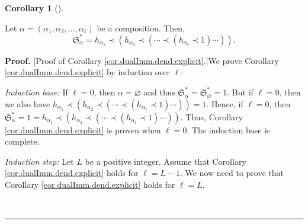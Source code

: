 \documentclass
[numbers=enddot,12pt,final,onecolumn,notitlepage,abstracton]{scrartcl}%
\theoremstyle{definition}
\newtheorem{coro}[theo]{Corollary}
\newenvironment{corollary}[1][]
{\begin{coro}[#1]\begin{leftbar}}
{\end{leftbar}\end{coro}}
\newenvironment{proof}[1][Proof]{\noindent\textbf{#1.} }{\ \rule{0.5em}{0.5em}}
\newenvironment{verlong}{}{}
\begin{document}
\begin{corollary}
\label{cor.dualImm.dend.explicit}Let $\alpha=\left(  \alpha_{1},\alpha
_{2},\ldots,\alpha_{\ell}\right)  $ be a composition. Then,%
\[
\mathfrak{S}_{\alpha}^{\ast}=h_{\alpha_{1}}\left.  \prec\right.  \left(
h_{\alpha_{2}}\left.  \prec\right.  \left(  \cdots\left.  \prec\right.
\left(  h_{\alpha_{\ell}}\left.  \prec\right.  1\right)  \cdots\right)
\right)  .
\]

\end{corollary}

\begin{verlong}
\begin{proof}
[Proof of Corollary \ref{cor.dualImm.dend.explicit}.]We prove Corollary
\ref{cor.dualImm.dend.explicit} by induction over $\ell$:

\textit{Induction base:} If $\ell=0$, then $\alpha=\varnothing$ and thus
$\mathfrak{S}_{\alpha}^{\ast}=\mathfrak{S}_{\varnothing}^{\ast}=1$. But if
$\ell=0$, then we also have $h_{\alpha_{1}}\left.  \prec\right.  \left(
h_{\alpha_{2}}\left.  \prec\right.  \left(  \cdots\left.  \prec\right.
\left(  h_{\alpha_{\ell}}\left.  \prec\right.  1\right)  \cdots\right)
\right)  =1$. Hence, if $\ell=0$, then $\mathfrak{S}_{\alpha}^{\ast
}=1=h_{\alpha_{1}}\left.  \prec\right.  \left(  h_{\alpha_{2}}\left.
\prec\right.  \left(  \cdots\left.  \prec\right.  \left(  h_{\alpha_{\ell}%
}\left.  \prec\right.  1\right)  \cdots\right)  \right)  $. Thus, Corollary
\ref{cor.dualImm.dend.explicit} is proven when $\ell=0$. The induction base is complete.

\textit{Induction step:} Let $L$ be a positive integer. Assume that Corollary
\ref{cor.dualImm.dend.explicit} holds for $\ell=L-1$. We now need to prove
that Corollary \ref{cor.dualImm.dend.explicit} holds for $\ell=L$.


\end{proof}
\end{verlong}
\end{document}
